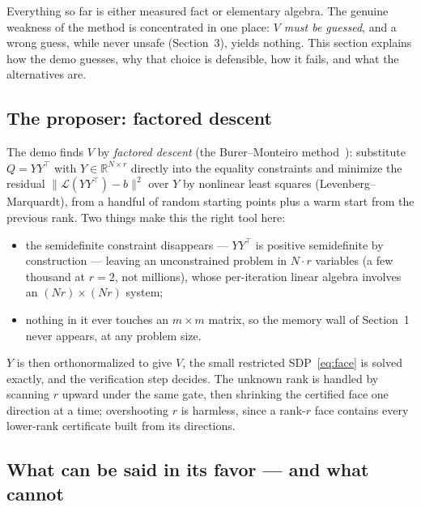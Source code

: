 \documentclass[11pt]{article}
\newcommand{\R}{\mathbb{R}}
\begin{document}
Everything so far is either measured fact or elementary algebra. The genuine
weakness of the method is concentrated in one place: \emph{$V$ must be
guessed}, and a wrong guess, while never unsafe (Section~3), yields nothing.
This section explains how the demo guesses, why that choice is defensible,
how it fails, and what the alternatives are.

\subsection*{The proposer: factored descent}

The demo finds $V$ by \emph{factored descent} (the Burer--Monteiro
method~\cite{bm2003}): substitute $Q=YY^{\top}$ with $Y\in\R^{N\times r}$
directly into the equality constraints and minimize the residual
$\|\mathcal{L}(YY^{\top})-b\|^2$ over $Y$ by nonlinear least squares
(Levenberg--Marquardt), from a handful of random starting points plus a
warm start from the previous rank. Two things make this the right tool here:
\begin{itemize}
\item the semidefinite constraint disappears --- $YY^{\top}$ is positive
      semidefinite by construction --- leaving an unconstrained problem in
      $N\!\cdot\!r$ variables (a few thousand at $r=2$, not millions), whose
      per-iteration linear algebra involves an $(Nr)\times(Nr)$ system;
\item nothing in it ever touches an $m\times m$ matrix, so the memory wall of
      Section~1 never appears, at any problem size.
\end{itemize}
$Y$ is then orthonormalized to give $V$, the small restricted
SDP~\eqref{eq:face} is solved exactly, and the verification step decides.
The unknown rank is handled by scanning $r$ upward under the same gate, then
shrinking the certified face one direction at a time; overshooting $r$ is
harmless, since a rank-$r$ face contains every lower-rank certificate built
from its directions.

\subsection*{What can be said in its favor --- and what cannot}
\end{document}
